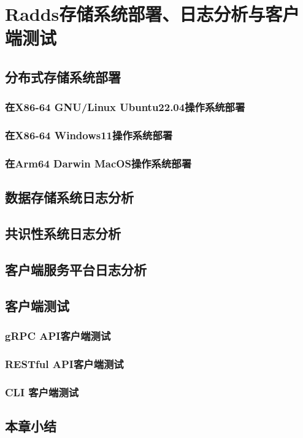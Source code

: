 \section{Radds存储系统部署、日志分析与客户端测试}

	\subsection{分布式存储系统部署}
	\subsubsection{在X86-64 GNU/Linux Ubuntu22.04操作系统部署}

	\subsubsection{在X86-64 Windows11操作系统部署}

	\subsubsection{在Arm64 Darwin MacOS操作系统部署}
	
	\subsection{数据存储系统日志分析}

	\subsection{共识性系统日志分析}

	\subsection{客户端服务平台日志分析}

	
	\subsection{客户端测试}
	
	\subsubsection{gRPC API客户端测试}


 	\subsubsection{RESTful API客户端测试}
 	
 	
 	\subsubsection{CLI 客户端测试}


	\subsection{本章小结}
	
\clearpage